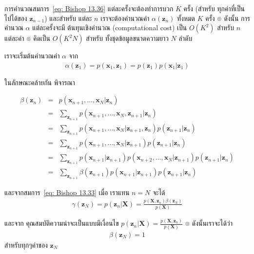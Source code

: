 การคำนวณสมการ~\ref{eq: Bishop 13.36} แต่ละครั้งจะต้องทำการบวก $K$ ครั้ง (สำหรับ ทุกค่าที่เป็นไปได้ของ $\textbf{z}_{n-1}$) และสำหรับ แต่ละ $n$ เราจะต้องคำนวณค่า $\alpha(\textbf{z}_n)$ ทั้งหมด $K$ ครั้ง
๏ ดังนั้น การคำนวณ $\alpha$ แต่ละครั้งจะมี ต้นทุนเชิงคำนวณ (computational cost) เป็น $O(K^2)$ สำหรับ $n$ แต่ละค่า
๏ คิดเป็น $O(K^2 N)$ สำหรับ ทั้งชุดข้อมูลขนาดความยาว $N$ ลำดับ

เราจะเริ่มต้นคำนวณค่า $\alpha$ จาก 
\begin{eqnarray}
\alpha(\textbf{z}_1) = p(\textbf{x}_1, \textbf{z}_1) = p(\textbf{z}_1) p(\textbf{x}_1|\textbf{z}_1)
\label{eq: Bishop 13.37}
\end{eqnarray}

ในลักษณะคล้ายกัน พิจารณา

\begin{eqnarray}
\beta(\textbf{z}_n) 
&=& p(\textbf{x}_{n+1}, \ldots, \textbf{x}_N|\textbf{z}_n)
\nonumber \\
&=& \sum_{\textbf{z}_{n+1}} p(\textbf{x}_{n+1}, \ldots, \textbf{x}_N, \textbf{z}_{n+1}|\textbf{z}_n)
\nonumber \\
&=& \sum_{\textbf{z}_{n+1}} p(\textbf{x}_{n+1}, \ldots, \textbf{x}_N | \textbf{z}_{n+1}, \textbf{z}_n) p(\textbf{z}_{n+1}|\textbf{z}_n)
\nonumber \\
&=& \sum_{\textbf{z}_{n+1}} p(\textbf{x}_{n+1}, \ldots, \textbf{x}_N | \textbf{z}_{n+1}) p(\textbf{z}_{n+1}|\textbf{z}_n)
\nonumber \\
&=& \sum_{\textbf{z}_{n+1}} p(\textbf{x}_{n+1}|\textbf{z}_{n+1}) p(\textbf{x}_{n+2}, \ldots, \textbf{x}_N | \textbf{z}_{n+1}) p(\textbf{z}_{n+1}|\textbf{z}_n)
\nonumber \\
&=& \sum_{\textbf{z}_{n+1}} \beta(\textbf{z}_{n+1})  p(\textbf{x}_{n+1}|\textbf{z}_{n+1}) p(\textbf{z}_{n+1}|\textbf{z}_n)
\label{eq: Bishop 13.38}
\end{eqnarray}

และจากสมการ~\ref{eq: Bishop 13.33} เมื่อ เราแทน $n=N$ จะได้
\begin{eqnarray}
\gamma(\textbf{z}_N) = p(\textbf{z}_n|\textbf{X}) = \frac{p(\textbf{X}, \textbf{z}_n) \beta(\textbf{z}_N)}{p(\textbf{X})}
\label{eq: Bishop 13.39}
\end{eqnarray}

และจาก คุณสมบัติความน่าจะเป็นแบบมีเงื่อนไข $p(\textbf{z}_n|\textbf{X}) = \frac{p(\textbf{X}, \textbf{z}_n)}{p(\textbf{X})}$
๏ ดังนั้นเราจะได้ว่า
\begin{eqnarray}
\beta(\textbf{z}_N) = 1
\label{eq: HMM beta 1}
\end{eqnarray}
สำหรับทุกๆค่าของ $\textbf{z}_N$

